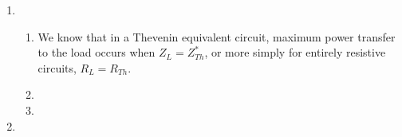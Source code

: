 

\begin{enumerate}
	
	\item{
	\begin{enumerate}
		\item{
			We know that in a Thevenin equivalent circuit, maximum power transfer to the load occurs when $Z_L = Z_{Th}^*$, or more simply for entirely resistive circuits, $R_L = R_{Th}$.
		}
		
		\item{
		
		}
		
		\item{
		
		}
	\end{enumerate}
	}
	
	\item{
	
	}
\end{enumerate}